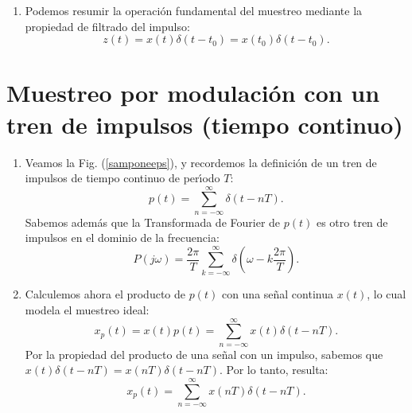 \begin{enumerate}
	\item Podemos resumir la operaci\'{o}n fundamental del muestreo mediante la propiedad de filtrado del impulso:              
	\begin{equation}
		z(t) = x(t) \delta(t-t_{0}) = x(t_{0}) \delta(t-t_{0}).
	\end{equation}
\end{enumerate}

\section{Muestreo por modulaci\'{o}n con un tren de impulsos (tiempo continuo)}

\begin{enumerate}
	\item Veamos la Fig. (\ref{samponeeps}), y recordemos la definici\'{o}n de un tren de impulsos de tiempo continuo de per\'{\i}odo $T$:
	\begin{equation}
		p(t) = \sum_{n=-\infty}^{\infty} \delta(t-nT).
		\label{samptemp}
	\end{equation}
	Sabemos adem\'{a}s que la Transformada de Fourier de $p(t)$ es otro tren de impulsos en el dominio de la frecuencia:
	\begin{equation}
		P(j\omega) = \frac{2\pi}{T} \sum_{k=-\infty}^{\infty} \delta\left(\omega - k\frac{2\pi}{T}\right).
		\label{fouriertrenimp}
	\end{equation}
	
	\item Calculemos ahora el producto de $p(t)$ con una se\~{n}al continua $x(t)$, lo cual modela el muestreo ideal:
	\begin{equation}
		x_{p}(t) = x(t) p(t) = \sum_{n=-\infty}^{\infty} x(t) \delta(t-nT).
	\end{equation}
	Por la propiedad del producto de una se\~{n}al con un impulso, sabemos que $x(t) \delta(t-nT) = x(nT) \delta(t-nT)$. Por lo tanto, resulta: 
	\begin{equation}
		x_{p}(t) = \sum_{n=-\infty}^{\infty} x(nT) \delta(t-nT).
	\end{equation}
	

\end{enumerate}
